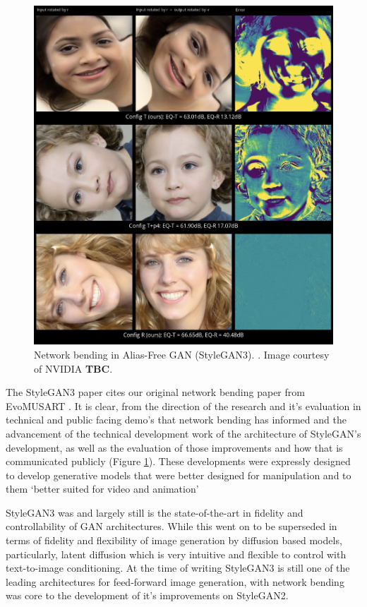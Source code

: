 \begin{figure}[!htb]
    \centering
    \captionsetup{justification=centering}
    \includegraphics[width=1\textwidth]{figures/c7_impact/net-bend-technical/style-gan-rotations.png}
    \caption[Network bending in Alias-Free GAN (StyleGAN3)]{Network bending in Alias-Free GAN (StyleGAN3). \citep{karras2021alias}. Image courtesy of NVIDIA \textbf{TBC}.}
    \label{fig:c7:alias-free-gan}
\end{figure}

 The StyleGAN3 paper cites our original network bending paper from EvoMUSART \citep{broad2021network}.
 It is clear, from the direction of the research and it’s evaluation in technical and public facing demo’s that network bending has informed and the advancement of the technical development work of the architecture of StyleGAN's development, as well as the evaluation of those improvements and how that is communicated publicly (Figure \ref{fig:c7:alias-free-gan}). 
 These developments were expressly designed to develop generative models that were better designed for manipulation and to them `better suited for video and animation' \citep{karras2021alias}

StyleGAN3 was and largely still is the state-of-the-art in fidelity and controllability of GAN architectures. 
While this went on to be superseded in terms of fidelity and flexibility of image generation by diffusion based models, particularly, latent diffusion \citep{rombach2022high} which is very intuitive and flexible to control with text-to-image conditioning.
At the time of writing StyleGAN3 is still one of the leading architectures for feed-forward image generation, with network bending was core to the development of it's improvements on StyleGAN2. 

